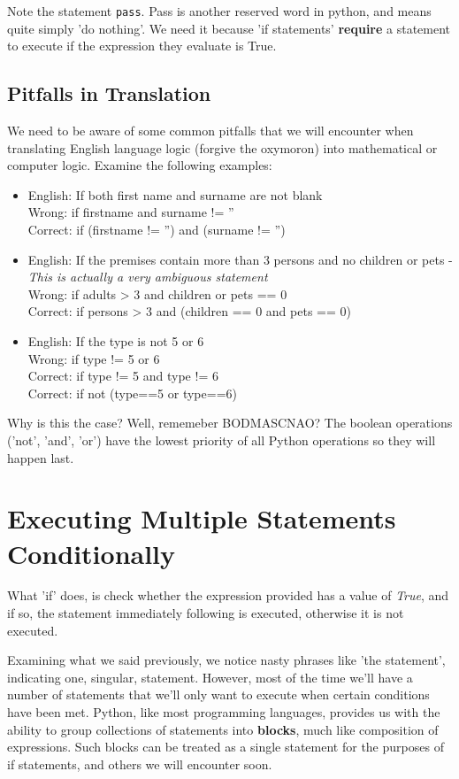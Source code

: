 Note the statement 
\texttt{pass}. Pass   is another reserved word in python, and means quite simply 'do   nothing'. We need it because 'if statements' \textbf{require} a   statement to execute if the expression they evaluate is True.

\subsection{Pitfalls in Translation}

We need to be aware of some common pitfalls that we will encounter   when translating English language logic (forgive the oxymoron) into   mathematical or computer logic. Examine the following examples:
\begin{itemize}
	\item English: If both first name and surname are not blank
\\     Wrong: if firstname and surname != ''    
\\     Correct: if (firstname != '') and (surname != '')    
	\item English: If the premises contain more than 3 persons and no    children or pets - \textit{This is actually a very ambiguous statement}
\\     Wrong: if adults > 3 and children or pets == 0    
\\     Correct: if persons > 3 and (children == 0 and pets == 0)    
	\item English: If the type is not 5 or 6
\\     Wrong: if type != 5 or 6    
\\     Correct: if type != 5 and type != 6
\\     Correct: if not (type==5 or type==6)     
\end{itemize}

Why is this the case? Well, rememeber BODMASCNAO? The boolean operations ('not', 'and', 'or') have the lowest priority of all Python operations so they                 will happen last.

\section{Executing Multiple Statements Conditionally}     What 'if' does, is check whether the expression provided has a    value of \textit{True}, and if so, the statement immediately    following is executed, otherwise it is not executed.    

Examining what we said previously, we notice nasty phrases like 'the   statement', indicating one, singular, statement. However, most of the   time we'll have a number of statements that we'll only want to execute when certain   conditions have been met. Python, like most programming languages,   provides us with the ability to group collections of statements into   \textbf{blocks}, much like composition of expressions. Such   blocks can be treated as a single statement for the purposes of if   statements, and others we will encounter soon.

